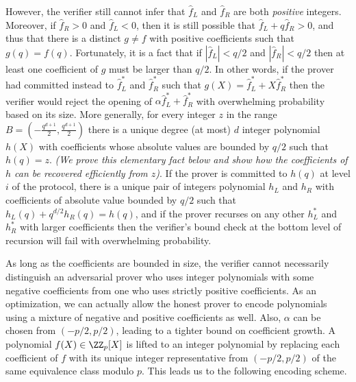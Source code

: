 However, the verifier still cannot infer that $\hat{f}_L$ and $\hat{f}_R$ are both \emph{positive} integers. Moreover, if $\hat{f}_R > 0$ and $\hat{f}_L < 0$, then it is still possible that $\hat{f}_L + q \hat{f}_R > 0$, and thus that there is a distinct $g \neq f$ with positive coefficients such that $g(q) = f(q)$. Fortunately, it is a fact that if $|\hat{f}_L| < q/2$ and $|\hat{f}_R| < q/2$ then at least one coefficient of $g$ must be larger than $q/2$. In other words, if the prover had committed instead to $\hat{f}^*_L$ and $\hat{f}^*_R$ such that $g(X) = \hat{f}^*_L + X\hat{f}^*_R$ then the verifier would reject the opening of $\alpha \hat{f}^*_L + \hat{f}^*_R$ with overwhelming probability based on its size. 
More generally, for every integer $z$ in the range $B = (-\frac{q^{d+1}}{2}, \frac{q^{d+1}}{2})$ there is a unique degree (at most) $d$ integer polynomial $h(X)$ with coefficients whose absolute values are bounded by $q/2$ such that $h(q) = z$. \emph{(We prove this elementary fact below and show how the coefficients of $h$ can be recovered efficiently from $z$)}. If the prover is committed to $h(q)$ at level $i$ of the protocol, there is a unique pair of integers polynomial $h_L$ and $h_R$ with coefficients of absolute value bounded by $q/2$ such that $h_L(q) + q^{d/2} h_R(q) = h(q)$, and if the prover recurses on any other $h_L^*$ and $h_R^*$ with larger coefficients then the verifier's bound check at the bottom level of recursion will fail with overwhelming probability. 

As long as the coefficients are bounded in size, the verifier cannot necessarily distinguish an adversarial prover who uses integer polynomials with some negative coefficients from one who uses strictly positive coefficients. As an optimization, we can actually allow the honest prover to encode polynomials using a mixture of negative and positive coefficients as well. Also, $\alpha$ can be chosen from $(-p/2, p/2)$, leading to a tighter bound on coefficient growth. A polynomial $f(X) \in \ZZ_p[X]$ is lifted to an integer polynomial by replacing each coefficient of $f$ with its unique integer representative from $(-p/2,p/2)$ of the same equivalence class modulo $p$. This leads us to the following encoding scheme. 

